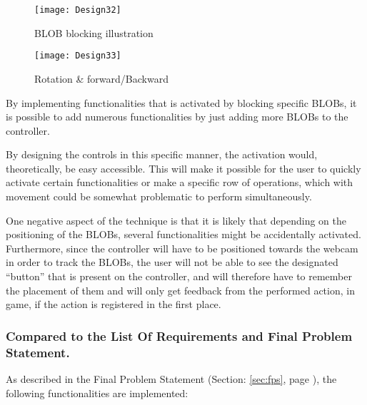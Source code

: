 \begin{figure}[h]
\centering
\caption{BLOB blocking illustration}
\label{fig:design32}
\texttt{[image: Design32]}
\end{figure}

\begin{figure}[h]
\centering
\texttt{[image: Design33]}
\caption{Rotation \& forward/Backward}
\label{fig:design33}
\end{figure}

By implementing functionalities that is activated by blocking specific BLOBs, it is possible to add numerous functionalities by just adding more BLOBs to the controller. 

By designing the controls in this specific manner, the activation would, theoretically, be easy accessible. This will make it possible for the user to quickly activate certain functionalities or make a specific row of operations, which with movement could be somewhat problematic to perform simultaneously. 

One negative aspect of the technique is that it is likely that depending on the positioning of the BLOBs, several functionalities might be accidentally activated. Furthermore, since the controller will have to be positioned towards the webcam in order to track the BLOBs, the user will not be able to see the designated “button” that is present on the controller, and will therefore have to remember the placement of them and will only get feedback from the performed action, in game, if the action is registered in the first place.


\subsubsection*{Compared to the List Of Requirements and Final Problem Statement.}
As described in the Final Problem Statement (Section: \ref{sec:fps}, page \pageref{sec:fps}), the following functionalities are implemented:

